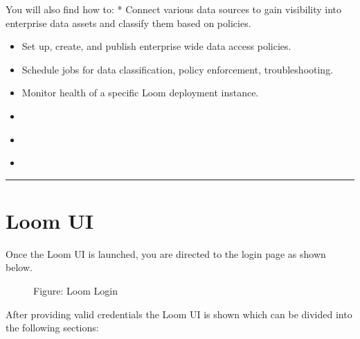 \documentclass[letterpaper,10pt,english]{sphinxmanual}
\begin{document}
You will also find how to:
* Connect various data sources to gain visibility into enterprise data assets and classify them based on policies.
\begin{itemize}
\item {} 
Set up, create, and publish enterprise wide data access policies.

\item {} 
Schedule jobs for data classification, policy enforcement, troubleshooting.

\item {} 
Monitor health of a specific Loom deployment instance.

\end{itemize}

\begin{sphinxShadowBox}
\begin{itemize}
\item {} 
\label{\detokenize{loom_getting_started_guide:id75}}{\hyperref[\detokenize{loom_getting_started_guide:loom-ui}]{}}

\item {} 
\label{\detokenize{loom_getting_started_guide:id76}}{\hyperref[\detokenize{loom_getting_started_guide:loom-dashboard}]{}}

\item {} 
\label{\detokenize{loom_getting_started_guide:id77}}{\hyperref[\detokenize{loom_getting_started_guide:loom-workflows}]{}}

\end{itemize}
\end{sphinxShadowBox}


\bigskip\hrule\bigskip



\section{Loom UI}
\label{\detokenize{loom_getting_started_guide:loom-ui}}
Once the Loom UI is launched, you are directed to the login page as shown below.

\begin{figure}[htbp]
\centering
\capstart

\noindent{}
\caption{Figure: Loom Login}\label{\detokenize{loom_getting_started_guide:id15}}\end{figure}
\label{\detokenize{loom_getting_started_guide:id3}}
After providing valid credentials the Loom UI is shown which can be divided into the following sections:
\end{document}
